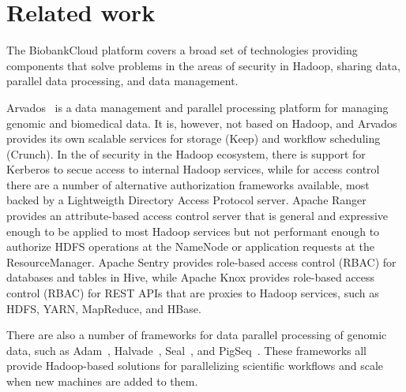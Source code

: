 \section{Related work}

The BiobankCloud platform covers a broad set of technologies providing components that solve problems in the areas of security in Hadoop, sharing data, parallel data processing, and data management.

Arvados~\cite{Arvados} is a data management and parallel processing platform for managing genomic and biomedical data. It is, however, not based on Hadoop, and Arvados provides its own scalable services for storage (Keep) and workflow scheduling (Crunch).
In the of security in the Hadoop ecosystem, there is support for Kerberos to secue access to internal Hadoop services, while for access control there are a number of alternative authorization frameworks available, most backed by a Lightweigth Directory Access Protocol server. Apache Ranger provides an attribute-based access control server that is general and expressive enough to be applied to most Hadoop services but not performant enough to authorize HDFS operations at the NameNode or application requests at the ResourceManager. Apache Sentry provides role-based access control (RBAC) for databases and tables in Hive, while Apache Knox provides role-based access control (RBAC) for REST APIs that are proxies to Hadoop services, such as HDFS, YARN, MapReduce, and HBase. 

There are also a number of frameworks for data parallel processing of genomic data, such as Adam~\cite{adam15}, Halvade~\cite{halvade15}, Seal~\cite{seal11}, and PigSeq~\cite{seqpig14}. These frameworks all provide Hadoop-based solutions for parallelizing scientific workflows and scale when new machines are added to them.